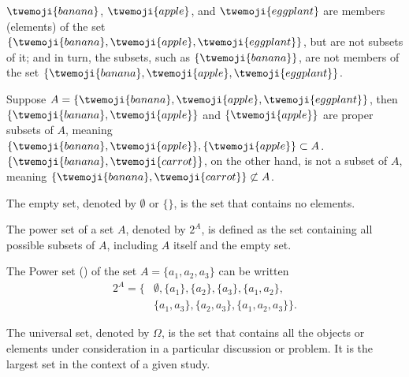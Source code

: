 \begin{example}
	$\twemoji{banana}$, $\twemoji{apple}$, and $\twemoji{eggplant}$ are members (elements) of the set $\{\twemoji{banana}, \twemoji{apple}, \twemoji{eggplant}\}$, but are not subsets of it; and in turn, the subsets, such as $\{\twemoji{banana}\}$, are not members of the set $\{\twemoji{banana}, \twemoji{apple}, \twemoji{eggplant}\}$.
\end{example}

\begin{example}
	Suppose $A = \{\twemoji{banana}, \twemoji{apple}, \twemoji{eggplant}\}$, then $\{\twemoji{banana}, \twemoji{apple}\}$ and $\{\twemoji{apple}\}$ are proper subsets of $A$, meaning $\{\twemoji{banana}, \twemoji{apple}\},\{\twemoji{apple}\}\subset  A$. $\{\twemoji{banana}, \twemoji{carrot}\}$, on the other hand, is not a subset of $A$, meaning $\{\twemoji{banana}, \twemoji{carrot}\}\not\subset  A$.
\end{example}

\begin{definition}
	The empty set, denoted by $\emptyset$ or $\{\}$, is the set that contains no elements.
\end{definition}

\begin{definition}
	\label{def:power_set}
	The power set of a set $A$, denoted by $2^A$, is defined as the set containing all possible subsets of $A$, including $A$ itself and the empty set.
\end{definition}

\begin{example}
	The Power set () of the set $A = \{a_1,a_2,a_3\}$ can be written
	\begin{equation}
		\begin{split}
			2^A = \{&\emptyset, \{a_1\}, \{a_2\}, \{a_3\}, \{a_1, a_2\},\\
			& \{a_1, a_3\}, \{a_2, a_3\}, \{a_1, a_2, a_3\}\}.
		\end{split}
	\end{equation}
\end{example}

\begin{definition}
	The universal set, denoted by $\Omega$, is the set that contains all the objects or elements under consideration in a particular discussion or problem. It is the largest set in the context of a given study.
\end{definition}

